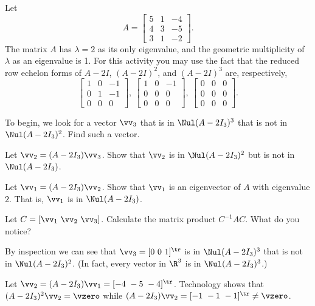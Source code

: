 \begin{activity} \label{act:JCF_gev_2} Let 
\[A = \left[ \begin{array}{ccr} 5&1&-4\\4&3&-5\\3&1&-2 \end{array} \right].\]
The matrix $A$ has $\lambda = 2$ as its only eigenvalue, and the geometric multiplicity of $\lambda$ as an eigenvalue is 1. For this activity you may use the fact that the reduced row echelon forms of $A-2I$, $(A-2I)^2$, and $(A-2I)^3$ are, respectively, 
\[\left[ \begin{array}{ccr} 1&0&-1\\0&1&-1\\0&0&0 \end{array} \right], \ \left[ \begin{array}{ccr} 1&0&-1\\0&0&0\\0&0&0 \end{array} \right], \ \left[ \begin{array}{ccc} 0&0&0\\0&0&0\\0&0&0 \end{array} \right].\]
\ba
\item To begin, we look for a vector $\vv_3$ that is in $\Nul (A-2I_3)^3$ that is not in $\Nul (A-2I_3)^2$. Find such a vector.

\item Let $\vv_2 = (A-2I_3)\vv_3$. Show that $\vv_2$ is in $\Nul (A-2I_3)^2$ but is not in $\Nul (A-2I_3)$. 

\item Let $\vv_1 = (A-2I_3)\vv_2$. Show that $\vv_1$ is an eigenvector of $A$ with eigenvalue $2$. That is, $\vv_1$ is in $\Nul (A-2I_3)$. 

\item Let $C = [\vv_1 \ \vv_2 \ \vv_3]$. Calculate the matrix product $C^{-1}AC$. What do you notice? 

\ea

\end{activity}

\ActivitySolution
	\ba
	\item By inspection we can see that $\vv_3 = [0 \ 0 \ 1]^{\tr}$ is in $\Nul (A-2I_3)^3$ that is not in $\Nul (A-2I_3)^2$. (In fact, every vector in $\R^3$ is in $\Nul (A-2I_3)^3$.)
	
	\item Let $\vv_2 = (A-2I_3)\vv_1 = [-4 \ -5 \ -4]^{\tr}$. Technology shows that $(A-2I_3)^2 \vv_2 = \vzero$ while $(A-2I_3) \vv_2 = [-1 \ -1 \ -1]^{\tr} \neq \vzero$. 
	
